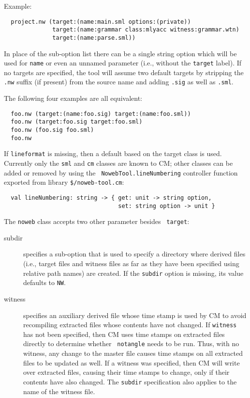 \documentclass[titlepage,letterpaper]{article}
\begin{document}
Example:

\begin{verbatim}
  project.nw (target:(name:main.sml options:(private))
              target:(name:grammar class:mlyacc witness:grammar.wtn)
              target:(name:parse.sml))
\end{verbatim}

In place of the sub-option list there can be a single string option
which will be used for {\tt name} or even an unnamed parameter (i.e.,
without the {\tt target} label).  If no targets are specified, the
tool will assume two default targets by stripping the {\tt .nw}
suffix (if present) from the source name and adding {\tt .sig} as well
as {\tt .sml}.

The following four examples are all equivalent:

\begin{verbatim}
  foo.nw (target:(name:foo.sig) target:(name:foo.sml))
  foo.nw (target:foo.sig target:foo.sml)
  foo.nw (foo.sig foo.sml)
  foo.nw
\end{verbatim}

If {\tt lineformat} is missing, then a default based on the target
class is used.  Currently only the {\tt sml} and {\tt cm} classes are
known to CM; other classes can be added or removed by using the {\tt
NowebTool.lineNumbering} controller function exported from library
{\tt \$/noweb-tool.cm}:

\begin{verbatim}
  val lineNumbering: string -> { get: unit -> string option,
                                 set: string option -> unit }
\end{verbatim}

The {\tt noweb} class accepts two other parameter besides {\tt
target}:

\begin{description}
\item[subdir] specifies a sub-option that is used to specify a
directory where derived files (i.e., target files and witness files as
far as they have been specified using relative path names) are
created.  If the {\tt subdir} option is missing, its value defaults to
{\tt NW}.
\item[witness] specifies an auxiliary derived file whose time stamp is
used by CM to avoid recompiling extracted files whose contents have
not changed.  If {\tt witness} has not been specified, then CM uses
time stamps on extracted files directly to determine whether {\tt
notangle} needs to be run.  Thus, with no witness, any change to the
master file causes time stamps on all extracted files to be updated as
well.  If a witness was specified, then CM will write over extracted
files, causing their time stamps to change, only if their contents
have also changed.  The {\tt subdir} specification also applies to the
name of the witness file.
\end{description}
\end{document}

